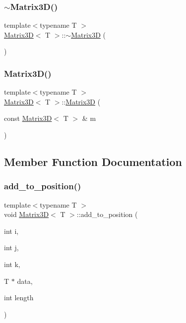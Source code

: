 \subsubsection{\texorpdfstring{$\sim$\+Matrix3\+D()}{~Matrix3D()}}
{\footnotesize\ttfamily template$<$typename T $>$ \\
\mbox{\hyperlink{classMatrix3D}{Matrix3D}}$<$ T $>$\+::$\sim$\mbox{\hyperlink{classMatrix3D}{Matrix3D}} (\begin{DoxyParamCaption}{ }\end{DoxyParamCaption})}

\mbox{\label{classMatrix3D_ae3fc93ef3456a36c92f8cbb7db01c3a9_ae3fc93ef3456a36c92f8cbb7db01c3a9}} 
\subsubsection{\texorpdfstring{Matrix3\+D()}{Matrix3D()}\hspace{0.1cm}{\footnotesize\ttfamily [3/3]}}
{\footnotesize\ttfamily template$<$typename T $>$ \\
\mbox{\hyperlink{classMatrix3D}{Matrix3D}}$<$ T $>$\+::\mbox{\hyperlink{classMatrix3D}{Matrix3D}} (\begin{DoxyParamCaption}\item[{const \mbox{\hyperlink{classMatrix3D}{Matrix3D}}$<$ T $>$ \&}]{m }\end{DoxyParamCaption})}



\subsection{Member Function Documentation}
\mbox{\label{classMatrix3D_a61afc3a397203f453f60772ebc10758a_a61afc3a397203f453f60772ebc10758a}} 
\subsubsection{\texorpdfstring{add\+\_\+to\+\_\+position()}{add\_to\_position()}}
{\footnotesize\ttfamily template$<$typename T $>$ \\
void \mbox{\hyperlink{classMatrix3D}{Matrix3D}}$<$ T $>$\+::add\+\_\+to\+\_\+position (\begin{DoxyParamCaption}\item[{int}]{i,  }\item[{int}]{j,  }\item[{int}]{k,  }\item[{T $\ast$}]{data,  }\item[{int}]{length }\end{DoxyParamCaption})}

